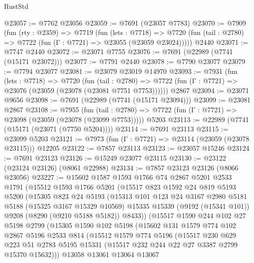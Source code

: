 \begin{lexlean}{RustStd}
\begin{coremodule}
@23057 := @7762 @23056
@23059 := @7691 (@23057 @7783)
@23070 := @7909
    (fun (rty : @2359) =>
    @7719
      (fun (lets : @7718) =>
      @7720 (fun (tail : @2780) => @7722 (fun (Γ : @7721) => @23055 (@23059 @23024)))))
    @2440
@23071 := @7747 @2440
@23072 := @23071 @7755
@23076 := @7691 (@22989 (@7741 (@15171 @23072)))
@23077 := @7791 @2440
@23078 := @7790 @23077
@23079 := @7794 @23077
@23081 := @23079 @23019 @14970
@23093 := @7931
    (fun (lets : @7718) =>
    @7720
      (fun (tail : @2780) =>
      @7722 (fun (Γ : @7721) => @23076 (@23059 (@23078 (@23081 @7751 @7753))))))
    @2867
@23094 := @23071 @9656
@23098 := @7691 (@22989 (@7741 (@15171 @23094)))
@23099 := @23081 @2867
@23108 := @7955
    (fun (tail : @2780) => @7722 (fun (Γ : @7721) => @23098 (@23059 (@23078 (@23099 @7753)))))
    @5203
@23113 := @22989 (@7741 (@15171 (@23071 (@7750 @5204))))
@23114 := @7691 @23113
@23115 := @23099 @5203
@23121 := @7973 (fun (Γ : @7721) => @23114 (@23059 (@23078 @23115))) @12205
@23122 := @7857 @23113
@23123 := @23057 @15246
@23124 := @7691 @23123
@23126 := @15249 @23077 @23115
@23130 := @23122 (@23124 @23126) (@8061 @22988)
@23134 := @7857 @23123 @23126 (@8066 @23056)
@23227 := @15602
    @1587
    @1593
    @1766
    @74
    @2867
    @5201
    @2533
    @1791
    (@15512
      @1593
      @1766
      @5201
      (@15517
        @823
        @1592
        @24
        @819
        @5193
        @5200
        (@15305
          @823
          @24
          @5193
          (@15313
            @101
            @123
            @24
            @3167
            @2980
            @5181
            @5188
            (@15325 @3167 @15329 @10569)
            @15335
            @15339
            (@9192 (@15341 @101))
            @9208
            (@8290 (@9210 @5188 @5182))
            @8433))
        (@15517
          @1590
          @244
          @102
          @27
          @5198
          @2799
          (@15305
            @1590
            @102
            @5198
            (@15602
              @131
              @1579
              @774
              @102
              @2867
              @5196
              @2533
              @814
              (@15512
                @1579
                @774
                @5196
                (@15517
                  @230
                  @629
                  @223
                  @51
                  @2783
                  @5195
                  @15331
                  (@15517 @232 @244 @22 @27 @3387 @2799 @15370 @15632)))
              @13058
              @13061
              @13064
              @13067

\end{coremodule}
\end{lexlean}
